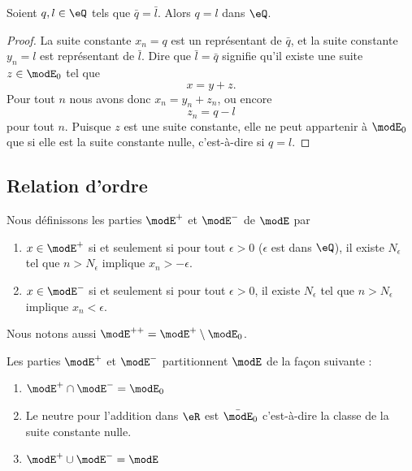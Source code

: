 \begin{lemma}       \label{LEMooYLQBooFistHs}
	Soient \( q,l\in \eQ\) tels que \( \bar q=\bar l\). Alors \( q=l\) dans \( \eQ\).
\end{lemma}

\begin{proof}
	La suite constante \( x_n=q\) est un représentant de \( \bar q\), et la suite constante \( y_n=l\) est représentant de \( \bar l\). Dire que \( \bar l=\bar q\) signifie qu'il existe une suite \( z\in \modE_0\) tel que
	\begin{equation}
		x=y+z.
	\end{equation}
	Pour tout \( n\) nous avons donc \( x_n=y_n+z_n\), ou encore
	\begin{equation}
		z_n=q-l
	\end{equation}
	pour tout \( n\). Puisque \( z\) est une suite constante, elle ne peut appartenir à \( \modE_0\) que si elle est la suite constante nulle, c'est-à-dire si \( q=l\).
\end{proof}

\subsection{Relation d'ordre}

\begin{definition}
	Nous définissons les parties \( \modE^+\) et \( \modE^-\) de \( \modE\) par
	\begin{enumerate}
		\item
		      \( x\in  \modE^+\) si et seulement si pour tout \( \epsilon>0\) (\( \epsilon\) est dans \( \eQ\)), il existe \( N_{\epsilon}\) tel que \( n>N_{\epsilon}\) implique \( x_n>-\epsilon\).
		\item
		      \( x\in  \modE^-\) si et seulement si pour tout \( \epsilon>0\), il existe \( N_{\epsilon}\) tel que \( n>N_{\epsilon}\) implique \( x_n<\epsilon\).
	\end{enumerate}
	Nous notons aussi \( \modE^{++}=\modE^+\setminus\modE_0\).
\end{definition}


\begin{lemma}       \label{LEMooJOYQooCDlhHW}
	Les parties \( \modE^+\) et \( \modE^-\) partitionnent \( \modE\) de la façon suivante :
	\begin{enumerate}
		\item   \label{ITEMooKRBYooZGhhch}
		      \( \modE^+\cap\modE^-=\modE_0 \)
		\item       \label{ITEMooRCIZooHUIymE}
		      Le neutre pour l'addition dans \( \eR\) est \( \bar\modE_0\) c'est-à-dire la classe de la suite constante nulle.
		\item       \label{ITEMooZRVXooANHspZ}
		      \( \modE^+\cup\modE^-=\modE\)
	\end{enumerate}
\end{lemma}

